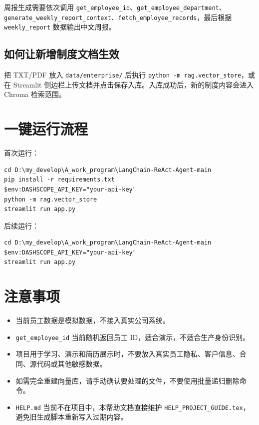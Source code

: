 \documentclass[UTF8,zihao=-4]{ctexart}
\begin{document}
周报生成需要依次调用 \texttt{get\_employee\_id}、\texttt{get\_employee\_department}、\texttt{generate\_weekly\_report\_context}、\texttt{fetch\_employee\_records}，最后根据 \texttt{weekly\_report} 数据输出中文周报。

\subsection{如何让新增制度文档生效}

把 TXT/PDF 放入 \texttt{data/enterprise/} 后执行 \texttt{python -m rag.vector\_store}，或在 Streamlit 侧边栏上传文档并点击保存入库。入库成功后，新的制度内容会进入 Chroma 检索范围。

\section{一键运行流程}

首次运行：

\begin{Verbatim}[breaklines=true,breakanywhere=true,fontsize=\small]
cd D:\my_develop\A_work_program\LangChain-ReAct-Agent-main
pip install -r requirements.txt
$env:DASHSCOPE_API_KEY="your-api-key"
python -m rag.vector_store
streamlit run app.py
\end{Verbatim}

后续运行：

\begin{Verbatim}[breaklines=true,breakanywhere=true,fontsize=\small]
cd D:\my_develop\A_work_program\LangChain-ReAct-Agent-main
$env:DASHSCOPE_API_KEY="your-api-key"
streamlit run app.py
\end{Verbatim}

\section{注意事项}

\begin{itemize}
\item 当前员工数据是模拟数据，不接入真实公司系统。
\item \texttt{get\_employee\_id} 当前随机返回员工 ID，适合演示，不适合生产身份识别。
\item 项目用于学习、演示和简历展示时，不要放入真实员工隐私、客户信息、合同、源代码或其他敏感数据。
\item 如需完全重建向量库，请手动确认要处理的文件，不要使用批量递归删除命令。
\item \texttt{HELP.md} 当前不在项目中，本帮助文档直接维护 \texttt{HELP\_PROJECT\_GUIDE.tex}，避免旧生成脚本重新写入过期内容。
\end{itemize}
\end{document}
